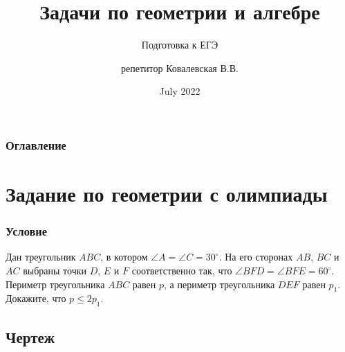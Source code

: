 \documentclass[compress, red]{beamer}
\title{Задачи по геометрии и алгебре}
\subtitle{Подготовка к ЕГЭ}
\author{репетитор Ковалевская В.В.\inst{1}}
\date{July 2022}
\begin{document}

\frame{\titlepage}


\begin{frame}

\frametitle{Оглавление}
\tableofcontents

\end{frame}

            
\section{Задание по геометрии с олимпиады}

\begin{frame}
\frametitle{Условие}
   \begin{Problem}
    Дан треугольник $ABC$, в котором $\angle A = \angle C =
    30^{\circ}$. \pause На его сторонах $AB$, $BC$ и $AC$
    выбраны точки $D$, $E$ и $F$ соответственно так, что
    $\angle BFD = \angle BFE = 60^{\circ}$. \pause Периметр
    треугольника $ABC$ равен $p$, а периметр треугольника
    $DEF$ равен $p_1$. \pause Докажите, что $p \leqslant
    2p_1$.
    \end{Problem}
\end{frame}


\subsection{Чертеж}
\end{document}
